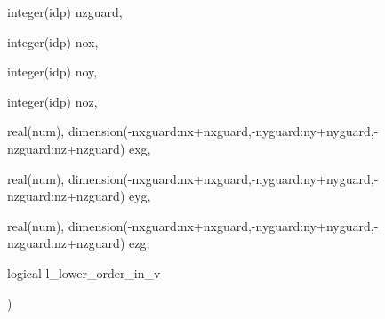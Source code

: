 {\begin{DoxyParamCaption}
\item[{integer(idp)}]{nzguard, }
\item[{integer(idp)}]{nox, }
\item[{integer(idp)}]{noy, }
\item[{integer(idp)}]{noz, }
\item[{real(num), dimension(-\/nxguard\+:nx+nxguard,-\/nyguard\+:ny+nyguard,-\/nzguard\+:nz+nzguard)}]{exg, }
\item[{real(num), dimension(-\/nxguard\+:nx+nxguard,-\/nyguard\+:ny+nyguard,-\/nzguard\+:nz+nzguard)}]{eyg, }
\item[{real(num), dimension(-\/nxguard\+:nx+nxguard,-\/nyguard\+:ny+nyguard,-\/nzguard\+:nz+nzguard)}]{ezg, }
\item[{logical}]{l\+\_\+lower\+\_\+order\+\_\+in\+\_\+v}
\end{DoxyParamCaption}
)}\hypertarget{field__gathering_8_f90_aff764c0eb8ae48e31d7bb6f39467cabf}{}\label{field__gathering_8_f90_aff764c0eb8ae48e31d7bb6f39467cabf}
